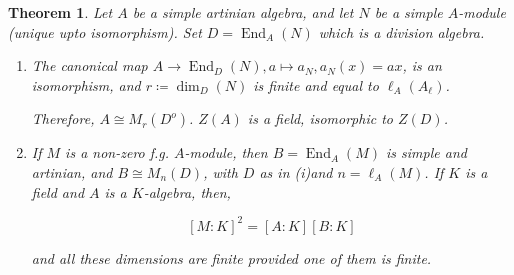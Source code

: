 \documentclass{article}
\theoremstyle{definition}
\theoremstyle{plain}
\newtheorem{theorem}{Theorem}[section]
\theoremstyle{remark}
\begin{document}
    \begin{theorem}
        Let \(A\) be a simple artinian algebra, and let \(N\) be a simple \(A\)-module (unique upto isomorphism). Set \(D = \operatorname{End}_A(N)\) which is a division algebra.

        \begin{enumerate}[label=\roman*)]
            \item The canonical map \(A \to \operatorname{End}_D(N), a \mapsto a_N, a_N(x) = ax\), is an isomorphism, and \(r \coloneqq \dim_D(N)\) is finite and equal to \(\ell_A(A_\ell)\).
            
            Therefore, \(A \cong M_r(D^o)\). \(Z(A)\) is a field, isomorphic to \(Z(D)\).

            \item If \(M\) is a non-zero f.g. \(A\)-module, then \(B = \operatorname{End}_A(M)\) is simple and artinian, and \(B\cong M_n(D)\), with \(D\) as in (i)and \(n = \ell_A(M)\). If \(K\) is a field and \(A\) is a \(K\)-algebra, then,
            
            \[
                [M:K]^2 = [A:K][B:K]
            \]

            and all these dimensions are finite provided one of them is finite.
        \end{enumerate} 
    \end{theorem}
\end{document}
